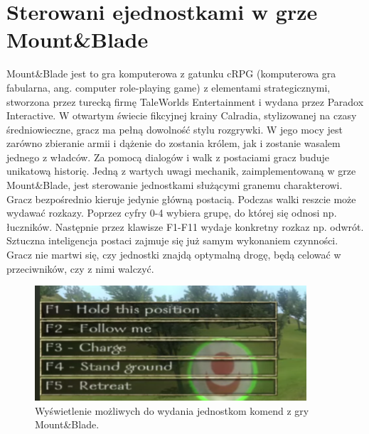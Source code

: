 \section{Sterowani ejednostkami w grze Mount\&Blade}\label{chap:mb}

Mount\&Blade jest to gra komputerowa z gatunku cRPG (komputerowa gra fabularna, ang. computer role-playing game) z elementami strategicznymi, stworzona przez turecką firmę TaleWorlds Entertainment i wydana przez Paradox Interactive. W otwartym świecie fikcyjnej krainy Calradia, stylizowanej na czasy średniowieczne, gracz ma pełną dowolność stylu rozgrywki. W jego mocy jest zarówno zbieranie armii i dążenie do zostania królem, jak i zostanie wasalem jednego z władców. Za pomocą dialogów i walk z postaciami gracz buduje unikatową historię.
Jedną z wartych uwagi mechanik, zaimplementowaną w grze Mount\&Blade, jest sterowanie jednostkami służącymi granemu charakterowi. Gracz bezpośrednio kieruje jedynie główną postacią. Podczas walki reszcie może wydawać rozkazy. Poprzez cyfry 0-4 wybiera grupę, do której się odnosi np. łuczników. Następnie przez klawisze F1-F11 wydaje konkretny rozkaz np. odwrót. Sztuczna inteligencja postaci zajmuje się już samym wykonaniem czynności. Gracz nie martwi się, czy jednostki znajdą optymalną drogę, będą celować w przeciwników, czy z nimi walczyć.

\begin{figure}[htbp]
    \centering
    \includegraphics[width=0.9\textwidth]{images/ui/commandsMountBla.png}
    \caption{Wyświetlenie możliwych do wydania jednostkom komend z gry Mount\&Blade.
    }\label{fig:MountnBlade}
\end{figure}
